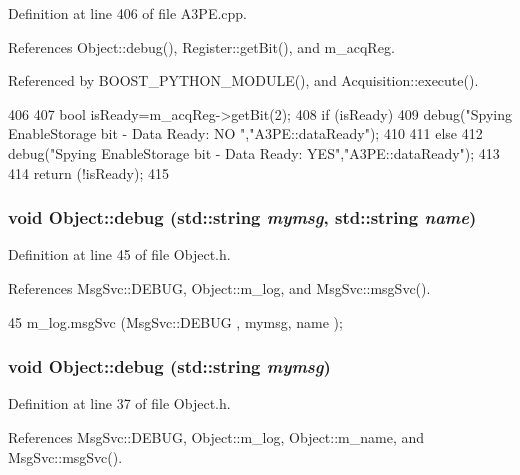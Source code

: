 Definition at line 406 of file A3PE.cpp.

References Object::debug(), Register::getBit(), and m\_\-acqReg.

Referenced by BOOST\_\-PYTHON\_\-MODULE(), and Acquisition::execute().


\begin{DoxyCode}
406                     {
407   bool isReady=m_acqReg->getBit(2);
408   if (isReady) {
409     debug("Spying EnableStorage bit - Data Ready: NO ","A3PE::dataReady");
410   }
411   else {
412     debug("Spying EnableStorage bit - Data Ready: YES","A3PE::dataReady");
413   }
414   return (!isReady);
415 }
\end{DoxyCode}
\hypertarget{classObject_a6c9a0397ca804e04d675ed05683f5420}{
\subsubsection[{debug}]{\setlength{\rightskip}{0pt plus 5cm}void Object::debug (std::string {\em mymsg}, \/  std::string {\em name})}}
\label{classObject_a6c9a0397ca804e04d675ed05683f5420}


Definition at line 45 of file Object.h.

References MsgSvc::DEBUG, Object::m\_\-log, and MsgSvc::msgSvc().


\begin{DoxyCode}
45 { m_log.msgSvc (MsgSvc::DEBUG   , mymsg, name ); }
\end{DoxyCode}
\hypertarget{classObject_aac010553f022165573714b7014a15f0d}{
\subsubsection[{debug}]{\setlength{\rightskip}{0pt plus 5cm}void Object::debug (std::string {\em mymsg})}}
\label{classObject_aac010553f022165573714b7014a15f0d}


Definition at line 37 of file Object.h.

References MsgSvc::DEBUG, Object::m\_\-log, Object::m\_\-name, and MsgSvc::msgSvc().

